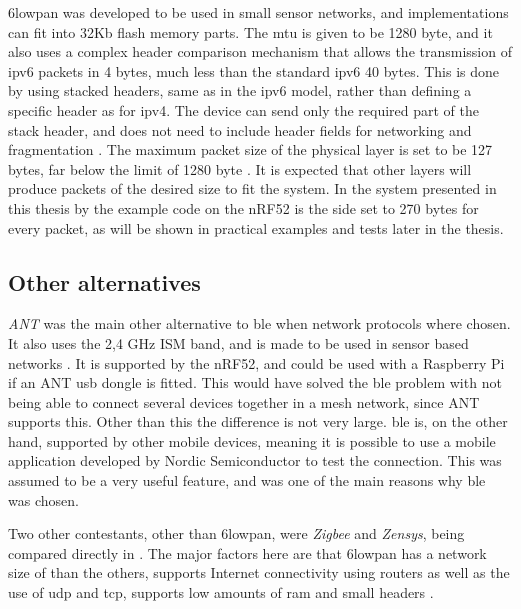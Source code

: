 \noindent \gls{6lowpan} was developed to be used in small sensor networks, and implementations can fit into 32Kb flash memory parts. The \gls{mtu} is given to be 1280 byte, and it also uses a complex header comparison mechanism that allows the transmission of \gls{ipv6} packets in 4 bytes, much less than the standard \gls{ipv6} 40 bytes. This is done by using stacked headers, same as in the \gls{ipv6} model, rather than defining a specific header as for \gls{ipv4}. The device can send only the required part of the stack header, and does not need to include header fields for networking and fragmentation \cite{hui2008extending}. The maximum packet size of the physical layer is set to be 127 bytes, far below the limit of 1280 byte \cite{kushalnagar2007transmission}. It is expected that other layers will produce packets of the desired size to fit the system. In the system presented in this thesis by the example code on the nRF52 is the side set to 270 bytes for every packet, as will be shown in practical examples and tests later in the thesis. 
  

\subsection{Other alternatives}

\noindent \textit{ANT} was the main other alternative to \gls{ble} when network protocols where chosen. It also uses  the 2,4 GHz ISM band, and is made to be used in sensor based networks \cite{ant} . It is supported by the \gls{nRF52}, and could be used with a \gls{Raspberry Pi} if an ANT \gls{usb} dongle is fitted. This would have solved the \gls{ble} problem with not being able to connect several devices together in a mesh network, since ANT supports this. Other than this the difference is not very large. \gls{ble} is, on the other hand, supported by other mobile devices, meaning it is possible to use a mobile application developed by Nordic Semiconductor to test the connection. This was assumed to be a very useful feature, and was one of the main reasons why \gls{ble} was chosen. 

\noindent Two other contestants, other than \gls{6lowpan}, were \textit{Zigbee} and \textit{Zensys}, being compared directly in \cite{mulligan20076lowpan}. The major factors here are that \gls{6lowpan} has a network size of  than the others, supports Internet connectivity using routers as well as the use of \gls{udp} and \gls{tcp}, supports low amounts of \gls{ram} and small headers \cite{mulligan20076lowpan}. 


